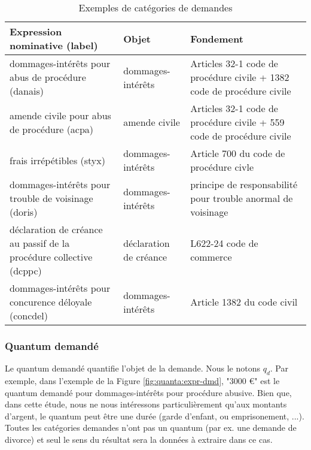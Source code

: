 \begin{table}[h!]
\scriptsize
\begin{tabular}{|p{}|p{}|p{}|}
\hline
\textbf{Expression nominative (label)  }                                     & \textbf{Objet}                                                       & \textbf{Fondement}                                                                 \\ \hline
dommages-intérêts pour abus de procédure (danais)                    & dommages-intérêts                                           & Articles 32-1 code de procédure civile + 1382 code de procédure civile \\ \hline
amende civile pour abus de procédure (acpa)                        & amende civile                                               & Articles 32-1 code de procédure civile + 559 code de procédure civile  \\ \hline
frais irrépétibles  (styx)                                        & dommages-intérêts                                           & Article 700 du code de procédure civle                                 \\ \hline
dommages-intérêts pour trouble de voisinage (doris)                 & dommages-intérêts                                           & principe de responsabilité pour trouble anormal de voisinage           \\ \hline
déclaration de créance au passif de la procédure collective (dcppc) & déclaration de créance & L622-24 code de commerce                                               \\ \hline
dommages-intérêts pour concurence déloyale (concdel)                  & dommages-intérêts                                           & Article 1382 du code civil                                             \\ \hline
\end{tabular}
\caption{Exemples de catégories de demandes}\label{tab:quanta:exemple-categorie}
\end{table}

\subsubsection{Quantum demandé}
Le quantum demandé quantifie l'objet de la demande. Nous le notons $q_d$. Par exemple, dans l'exemple de la Figure \ref{fig:quanta:expr-dmd}, "3000 \euro{}" est le quantum demandé pour dommages-intérêts pour procédure abusive. Bien que, dans cette étude, nous ne nous intéressons particulièrement qu'aux montants d'argent, le quantum peut être une durée (garde d'enfant, ou emprisonement, ...). Toutes les catégories demandes n'ont pas un quantum (par ex. une demande de divorce) et seul le sens du résultat sera la données à extraire dans ce cas.

